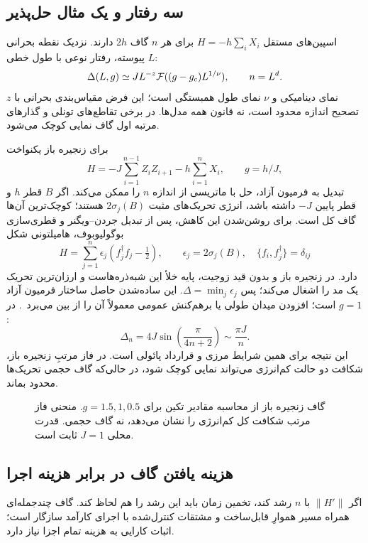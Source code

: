 \subsection{سه رفتار و یک مثال حل‌پذیر}
اسپین‌های مستقل $H=-h\sum_iX_i$ برای هر $n$ گاف $2h$ دارند.
نزدیک نقطه بحرانی پیوسته، رفتار نوعی با طول خطی $L$:
\begin{equation}
	\Delta(L,g)\simeq JL^{-z}{\cal F}((g-g_c)L^{1/\nu}),\qquad n=L^d.
\end{equation}
$z$ نمای دینامیکی و $\nu$ نمای طول همبستگی است؛ این فرض مقیاس‌بندی بحرانی با تصحیح اندازه محدود است، نه قانون همه مدل‌ها.
در برخی تقاطع‌های تونلی و گذارهای مرتبه اول گاف نمایی کوچک می‌شود.

برای زنجیره باز یکنواخت
\begin{equation}
	H=-J\sum_{i=1}^{n-1}Z_iZ_{i+1}-h\sum_{i=1}^nX_i,\qquad g=h/J,
\end{equation}
تبدیل به فرمیون آزاد، حل با ماتریسی از اندازه $n$ را ممکن می‌کند.
اگر $B$ قطر $h$ و قطر پایین $-J$ داشته باشد، انرژی تحریک‌های مثبت $2\sigma_j(B)$ هستند؛ کوچک‌ترین آن‌ها گاف کل است.
برای روشن‌شدن این کاهش، پس از تبدیل جردن--ویگنر و قطری‌سازی بوگولیوبوف، هامیلتونی شکل
\begin{equation}
	H=\sum_{j=1}^n\epsilon_j(f_j^\dagger f_j-\tfrac12),\qquad
	\epsilon_j=2\sigma_j(B),\quad \{f_i,f_j^\dagger\}=\delta_{ij}
\end{equation}
دارد. در زنجیره باز و بدون قید زوجیت، پایه خلأ این شبه‌ذره‌هاست و ارزان‌ترین تحریک یک مد را اشغال می‌کند؛ پس $\Delta=\min_j\epsilon_j$.
این ساده‌شدن حاصل ساختار فرمیون آزاد است؛ افزودن میدان طولی یا برهم‌کنش عمومی معمولاً آن را از بین می‌برد~\cite{GapPfeuty1970}.
در $g=1$:
\begin{equation}
	\Delta_n=4J\sin\!\left(\frac{\pi}{4n+2}\right)\sim\frac{\pi J}{n}.
	\label{eq:gap-open-chain}
\end{equation}
این نتیجه برای همین شرایط مرزی و قرارداد پائولی است.
در فاز مرتبِ زنجیره باز، شکافت دو حالت کم‌انرژی می‌تواند نمایی کوچک شود، در حالی‌که گاف حجمی تحریک‌ها محدود بماند.
\begin{figure}[htbp]
	\centering
	\caption{گاف زنجیره باز از محاسبه مقادیر تکین برای $g=1.5,1,0.5$. منحنی فاز مرتب شکافت کل کم‌انرژی را نشان می‌دهد، نه گاف حجمی. قدرت محلی $J=1$ ثابت است.}
	\label{fig:gap-size-scaling}
\end{figure}

\subsection{هزینه یافتن گاف در برابر هزینه اجرا}
اگر $\|H'\|$ با $n$ رشد کند، تخمین زمان باید این رشد را هم لحاظ کند.
گاف چندجمله‌ای همراه مسیر هموارِ قابل‌ساخت و مشتقات کنترل‌شده با اجرای کارآمد سازگار است؛ اثبات کارایی به هزینه تمام اجزا نیاز دارد.

